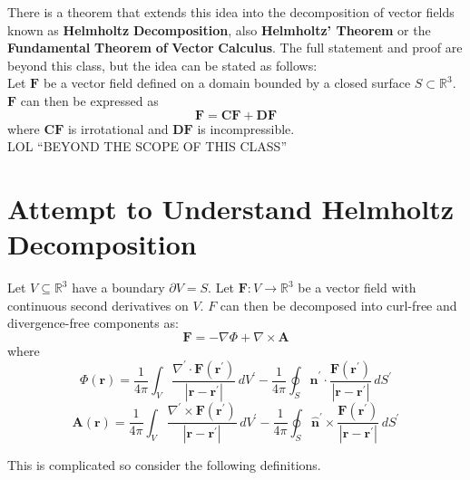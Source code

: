 \documentclass[12pt, letterpaper]{report}
\begin{document}
There is a theorem that extends this idea into the decomposition of vector fields known as \textbf{Helmholtz} \textbf{Decomposition}, also \textbf{Helmholtz' Theorem} or the \textbf{Fundamental} \textbf{Theorem} \textbf{of} \textbf{Vector} \textbf{Calculus}. The full statement and proof are beyond this class, but the idea can be stated as follows:\\
Let \(\mathbf{F} \) be a vector field defined on a domain bounded by a closed surface \(S\subset \mathbb{R} ^3\). \(\mathbf{F} \) can then be expressed as 
\[
    \mathbf{F} = \mathbf{CF} +\mathbf{DF} 
\]
where \(\mathbf{CF} \) is irrotational and \(\mathbf{DF} \) is incompressible.\\
LOL ``BEYOND THE SCOPE OF THIS CLASS''
\section{Attempt to Understand Helmholtz Decomposition}
\begin{theorem}
    Let \(V\subseteq \mathbb{R} ^3\) have a boundary \(\partial V=S\). Let \(\mathbf{F}:V\to \mathbb{R} ^3 \) be a vector field with continuous second derivatives on \(V\). \(F\) can then be decomposed into curl-free and divergence-free components as:
    \[
        \mathbf{F} =-\nabla \Phi +\nabla \times \mathbf{A} 
    \]
    where
    \[
        \Phi (\mathbf{r} )=\frac{1}{4\pi }\int_V \frac{\nabla ^{\prime} \cdot \mathbf{F} \left( \mathbf{r} ^{\prime}  \right) }{\left\vert \mathbf{r} -\mathbf{r} ^{\prime}  \right\vert }\,dV^{\prime} -\frac{1}{4\pi }\oint_S \mathbf{\hat{n}}^{\prime} \cdot \frac{\mathbf{F} \left( \mathbf{r} ^{\prime}  \right) }{\left\vert \mathbf{r} -\mathbf{r} ^{\prime}  \right\vert }\,dS^{\prime}
    \]
    \[
        \mathbf{A}(\mathbf{r} )=\frac{1}{4\pi }\int _{V}\frac{\nabla ^{\prime} \times \mathbf{F} \left( \mathbf{r} ^{\prime}  \right) }{\left\vert \mathbf{r} -\mathbf{r} ^{\prime}  \right\vert }\,dV^{\prime} -\frac{1}{4\pi }\oint_S \mathbf{\hat{n}}^{\prime} \times \frac{\mathbf{F} \left( \mathbf{r} ^{\prime}  \right) }{\left\vert \mathbf{r} -\mathbf{r} ^{\prime}  \right\vert }\,dS^{\prime} 
    \]
\end{theorem}
This is complicated so consider the following definitions.
\end{document}
